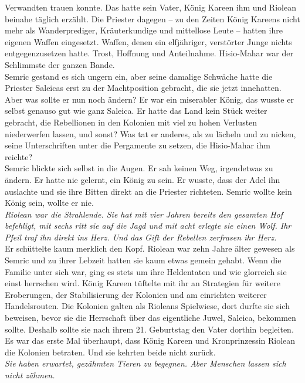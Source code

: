 Verwandten trauen konnte. Das hatte sein Vater, König Kareen ihm und Riolean beinahe täglich 
erzählt. Die Priester dagegen – zu den Zeiten König Kareens nicht mehr als Wanderprediger, 
Kräuterkundige und mittellose Leute – hatten ihre eigenen Waffen eingesetzt. Waffen, denen ein 
elfjähriger, verstörter Junge nichts entgegenzusetzen hatte. Trost, Hoffnung und Anteilnahme. 
Hisio-Mahar war der Schlimmste der ganzen Bande.\\
Semric gestand es sich ungern ein, aber seine 
damalige Schwäche hatte die Priester Saleicas erst zu der Machtposition gebracht, die sie jetzt 
innehatten. Aber was sollte er nun noch ändern? Er war ein miserabler König, das wusste er selbst 
genauso gut wie ganz Saleica. Er hatte das Land kein Stück weiter gebracht, die Rebellionen in den 
Kolonien mit viel zu hohen Verlusten niederwerfen lassen, und sonst? Was tat er anderes, als zu 
lächeln und zu nicken, seine Unterschriften unter die Pergamente zu setzen, die Hisio-Mahar ihm 
reichte?\\
Semric blickte sich selbst in die Augen. Er sah keinen Weg, irgendetwas zu ändern. Er hatte nie 
gelernt, ein König zu sein. Er wusste, dass der Adel ihn auslachte und sie ihre Bitten direkt an die 
Priester richteten. Semric wollte kein König sein, wollte er nie.\\
\textit{Riolean war die Strahlende. Sie hat mit vier Jahren bereits den gesamten Hof befehligt, mit 
sechs ritt sie auf die Jagd und mit acht erlegte sie einen Wolf. Ihr Pfeil traf ihn direkt ins Herz. 
Und das Gift der Rebellen zerfrasen ihr Herz.}\\
Er schüttelte kaum merklich den Kopf. Riolean war zehn Jahre älter gewesen als Semric und zu ihrer 
Lebzeit hatten sie kaum etwas gemein gehabt. Wenn die Familie unter sich war, ging es stets um ihre 
Heldentaten und wie glorreich sie einst herrschen wird. König Kareen tüftelte mit ihr an Strategien 
für weitere Eroberungen, der Stabilisierung der Kolonien und am einrichten weiterer Handelsrouten. 
Die Kolonien galten als Rioleans Spielwiese, dort durfte sie sich beweisen, bevor sie die Herrschaft 
über das eigentliche Juwel, Saleica, bekommen sollte. Deshalb sollte sie nach ihrem 21. Geburtstag 
den Vater dorthin begleiten. Es war das erste Mal überhaupt, dass König Kareen und Kronprinzessin 
Riolean die Kolonien betraten. Und sie kehrten beide nicht zurück.\\
\textit{Sie haben erwartet, gezähmten Tieren zu begegnen. Aber Menschen lassen sich nicht zähmen.}\\
